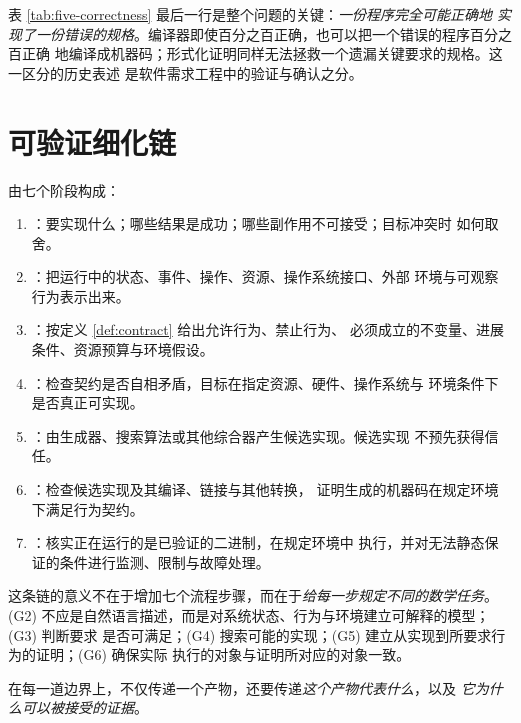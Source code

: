 表 \ref{tab:five-correctness} 最后一行是整个问题的关键：\emph{一份程序完全可能正确地
实现了一份错误的规格}。编译器即使百分之百正确，也可以把一个错误的程序百分之百正确
地编译成机器码；形式化证明同样无法拯救一个遗漏关键要求的规格。这一区分的历史表述
是软件需求工程中的验证与确认之分\cite{boehm1984}。

\section{可验证细化链}\label{sec:chain}

\begin{definition}[可验证细化链]\label{def:chain}
由七个阶段构成：
\begin{enumerate}[label=(G\arabic*)]
\item {}：要实现什么；哪些结果是成功；哪些副作用不可接受；目标冲突时
      如何取舍。
\item {}：把运行中的状态、事件、操作、资源、操作系统接口、外部
      环境与可观察行为表示出来。
\item {}：按定义 \ref{def:contract} 给出允许行为、禁止行为、
      必须成立的不变量、进展条件、资源预算与环境假设。
\item {}：检查契约是否自相矛盾，目标在指定资源、硬件、操作系统与
      环境条件下是否真正可实现。
\item {}：由生成器、搜索算法或其他综合器产生候选实现。候选实现
      不预先获得信任。
\item {}：检查候选实现及其编译、链接与其他转换，
      证明生成的机器码在规定环境下满足行为契约。
\item {}：核实正在运行的是已验证的二进制，在规定环境中
      执行，并对无法静态保证的条件进行监测、限制与故障处理。
\end{enumerate}
\end{definition}

这条链的意义不在于增加七个流程步骤，而在于\emph{给每一步规定不同的数学任务}。
(G2) 不应是自然语言描述，而是对系统状态、行为与环境建立可解释的模型；(G3) 判断要求
是否可满足；(G4) 搜索可能的实现；(G5) 建立从实现到所要求行为的证明；(G6) 确保实际
执行的对象与证明所对应的对象一致。

\begin{principle}[边界上传递什么]\label{pr:boundary}
在每一道边界上，不仅传递一个产物，还要传递\emph{这个产物代表什么}，以及
\emph{它为什么可以被接受的证据}。
\end{principle}

